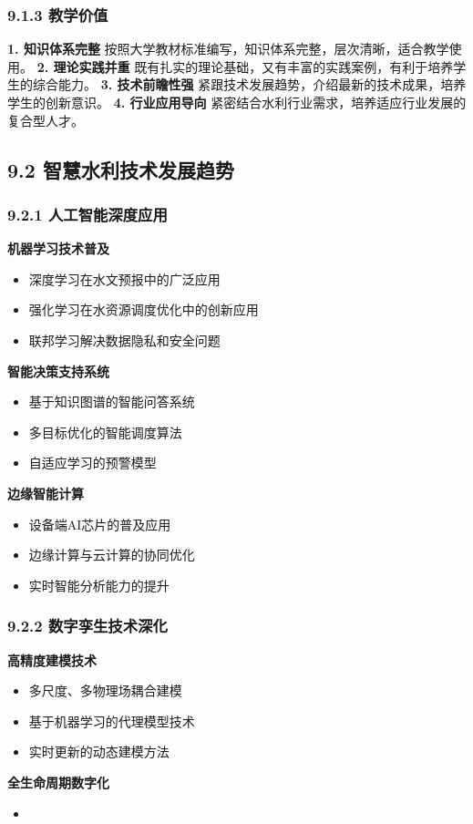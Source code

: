 \subsubsection{9.1.3 教学价值}\label{ux6559ux5b66ux4ef7ux503c} \textbf{1. 知识体系完整} 按照大学教材标准编写，知识体系完整，层次清晰，适合教学使用。 \textbf{2.
理论实践并重} 既有扎实的理论基础，又有丰富的实践案例，有利于培养学生的综合能力。 \textbf{3. 技术前瞻性强} 紧跟技术发展趋势，介绍最新的技术成果，培养学生的创新意识。 \textbf{4. 行业应用导向}
紧密结合水利行业需求，培养适应行业发展的复合型人才。 \subsection{9.2
智慧水利技术发展趋势}\label{ux667aux6167ux6c34ux5229ux6280ux672fux53d1ux5c55ux8d8bux52bf} \subsubsection{9.2.1
人工智能深度应用}\label{ux4ebaux5de5ux667aux80fdux6df1ux5ea6ux5e94ux7528} \textbf{机器学习技术普及} \begin{itemize} \tightlist \item
深度学习在水文预报中的广泛应用 \item 强化学习在水资源调度优化中的创新应用 \item 联邦学习解决数据隐私和安全问题 \end{itemize} \textbf{智能决策支持系统} \begin{itemize}
\tightlist \item 基于知识图谱的智能问答系统 \item 多目标优化的智能调度算法 \item 自适应学习的预警模型 \end{itemize} \textbf{边缘智能计算} \begin{itemize}
\tightlist \item 设备端AI芯片的普及应用 \item 边缘计算与云计算的协同优化 \item 实时智能分析能力的提升 \end{itemize} \subsubsection{9.2.2
数字孪生技术深化}\label{ux6570ux5b57ux5b6aux751fux6280ux672fux6df1ux5316-1} \textbf{高精度建模技术} \begin{itemize} \tightlist \item
多尺度、多物理场耦合建模 \item 基于机器学习的代理模型技术 \item 实时更新的动态建模方法 \end{itemize} \textbf{全生命周期数字化} \begin{itemize} \tightlist \item

\end{itemize}
